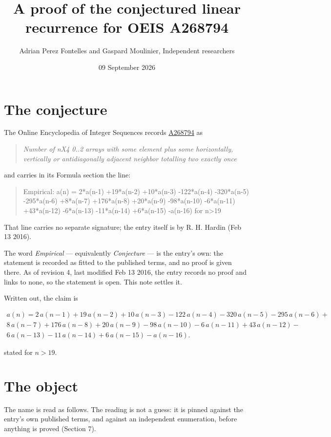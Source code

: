 \documentclass[11pt]{article}
\title{A proof of the conjectured linear recurrence for OEIS A268794}
\author{Adrian Perez Fontelles and Gaspard Moulinier, Independent researchers}
\date{09 September 2026}
\theoremstyle{definition}
\begin{document}
\maketitle
\section{The conjecture}

The Online Encyclopedia of Integer Sequences records \href{https://oeis.org/A268794}{A268794} as

\begin{quote}\itshape Number of nX4 0..2 arrays with some element plus some horizontally, vertically or antidiagonally adjacent neighbor totalling two exactly once\end{quote}

and carries in its Formula section the line:

\begin{quote}\ttfamily Empirical: a(n) = 2*a(n-1) +19*a(n-2) +10*a(n-3) -122*a(n-4) -320*a(n-5) -295*a(n-6) +8*a(n-7) +176*a(n-8) +20*a(n-9) -98*a(n-10) -6*a(n-11) +43*a(n-12) -6*a(n-13) -11*a(n-14) +6*a(n-15) -a(n-16) for n>19\end{quote}

That line carries no separate signature; the entry itself is by R. H. Hardin (Feb 13 2016).

The word {\itshape Empirical} --- equivalently {\itshape Conjecture} --- is the entry's own: the statement is recorded as fitted to the published terms, and no proof is given there. As of revision 4, last modified Feb 13 2016, the entry records no proof and links to none, so the statement is open. This note settles it.

Written out, the claim is

\begin{multline*} a(n) = 2\,a(n-1) + 19\,a(n-2) + 10\,a(n-3) - 122\,a(n-4) - 320\,a(n-5) - 295\,a(n-6) + \\ 8\,a(n-7) + 176\,a(n-8) + 20\,a(n-9) - 98\,a(n-10) - 6\,a(n-11) + 43\,a(n-12) - \\ 6\,a(n-13) - 11\,a(n-14) + 6\,a(n-15) - a(n-16). \end{multline*}

stated for $n > 19$.

\section{The object}

The name is read as follows. The reading is not a guess: it is pinned against the entry's own published terms, and against an independent enumeration, before anything is proved (Section 7).
\end{document}
